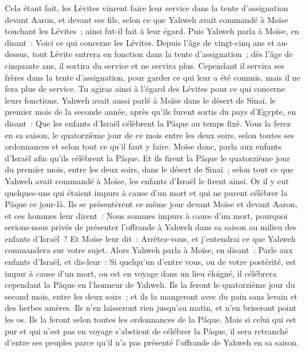 \begin{multicols}{2}
Cela étant fait, les Lévites vinrent faire leur service dans la tente d'assignation devant Aaron, et devant ses fils, selon ce que Yahweh avait commandé à Moïse touchant les Lévites~; ainsi fut-il fait à leur égard.
Puis Yahweh parla à Moïse, en disant~:
Voici ce qui concerne les Lévites. Depuis l'âge de vingt-cinq ans et au-dessus, tout Lévite entrera en fonction dans la tente d'assignation~;
dès l'âge de cinquante ans, il sortira du service et ne servira plus.
Cependant il servira ses frères dans la tente d'assignation, pour garder ce qui leur a été commis, mais il ne fera plus de service. Tu agiras ainsi à l'égard des Lévites pour ce qui concerne leurs fonctions.
\VerseOne{}Yahweh avait aussi parlé à Moïse dans le désert de Sinaï, le premier mois de la seconde année, après qu'ils furent sortis du pays d'Egypte, en disant~:
Que les enfants d'Israël célèbrent la Pâque au temps fixé.
Vous la ferez en sa saison, le quatorzième jour de ce mois entre les deux soirs, selon toutes ses ordonnances et selon tout ce qu'il faut y faire.
Moïse donc, parla aux enfants d'Israël afin qu'ils célèbrent la Pâque.
Et ils firent la Pâque le quatorzième jour du premier mois, entre les deux soirs, dans le désert de Sinaï~; selon tout ce que Yahweh avait commandé à Moïse, les enfants d'Israël le firent ainsi.
Or il y eut quelques-uns qui étaient impurs à cause d'un mort et qui ne purent célébrer la Pâque ce jour-là. Ils se présentèrent ce même jour devant Moïse et devant Aaron,
et ces hommes leur dirent~: Nous sommes impurs à cause d'un mort, pourquoi serions-nous privés de présenter l'offrande à Yahweh dans sa saison au milieu des enfants d'Israël~?
Et Moïse leur dit~: Arrêtez-vous, et j'entendrai ce que Yahweh commandera sur votre sujet.
Alors Yahweh parla à Moïse, en disant~:
Parle aux enfants d'Israël, et dis-leur~: Si quelqu'un d'entre vous, ou de votre postérité, est impur à cause d'un mort, ou est en voyage dans un lieu éloigné, il célébrera cependant la Pâque en l'honneur de Yahweh.
Ils la feront le quatorzième jour du second mois, entre les deux soirs~; et ils la mangeront avec du pain sans levain et des herbes amères.
Ils n'en laisseront rien jusqu'au matin, et n'en briseront point les os. Ils la feront selon toutes les ordonnances de la Pâque.
Mais si celui qui est pur et qui n'est pas en voyage s'abstient de célébrer la Pâque, il sera retranché d'entre ses peuples parce qu'il n'a pas présenté l'offrande de Yahweh en sa saison.

\end{multicols}
